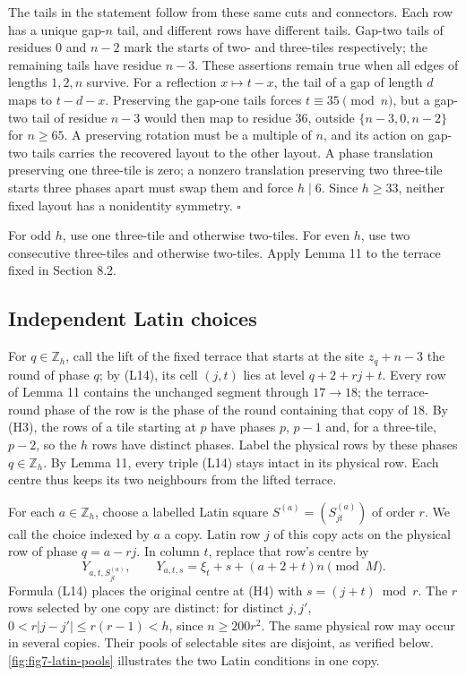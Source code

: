 \documentclass[11pt,a4paper]{article}
\begin{document}
The tails in the statement follow from these same cuts and connectors. Each row has a unique gap-\(n\) tail, and different rows have different tails. Gap-two tails of residues \(0\) and \(n-2\) mark the starts of two- and three-tiles respectively; the remaining tails have residue \(n-3\). These assertions remain true when all edges of lengths \(1,2,n\) survive. For a reflection \(x\mapsto t-x\), the tail of a gap of length \(d\) maps to \(t-d-x\). Preserving the gap-one tails forces \(t\equiv35\pmod n\), but a gap-two tail of residue \(n-3\) would then map to residue \(36\), outside \(\{n-3,0,n-2\}\) for \(n\geq65\). A preserving rotation must be a multiple of \(n\), and its action on gap-two tails carries the recovered layout to the other layout. A phase translation preserving one three-tile is zero; a nonzero translation preserving two three-tile starts three phases apart must swap them and force \(h\mid6\). Since \(h\geq33\), neither fixed layout has a nonidentity symmetry. \(\square\)

For odd \(h\), use one three-tile and otherwise two-tiles. For even \(h\), use two consecutive three-tiles and otherwise two-tiles. Apply Lemma 11 to the terrace fixed in Section 8.2.

\hypertarget{independent-latin-choices}{%
\subsection{Independent Latin choices}\label{independent-latin-choices}}

For \(q\in\mathbb Z_h\), call the lift of the fixed terrace that starts at the site \(z_q+n-3\) the round of phase \(q\); by (L14), its cell \((j,t)\) lies at level \(q+2+rj+t\). Every row of Lemma 11 contains the unchanged segment through \(17\to18\); the terrace-round phase of the row is the phase of the round containing that copy of \(18\). By (H3), the rows of a tile starting at \(p\) have phases \(p\), \(p-1\) and, for a three-tile, \(p-2\), so the \(h\) rows have distinct phases. Label the physical rows by these phases \(q\in\mathbb Z_h\). By Lemma 11, every triple (L14) stays intact in its physical row. Each centre thus keeps its two neighbours from the lifted terrace.

For each \(a\in\mathbb Z_h\), choose a labelled Latin square \(S^{(a)}=(S^{(a)}_{jt})\) of order \(r\). We call the choice indexed by \(a\) a copy. Latin row \(j\) of this copy acts on the physical row of phase \(q=a-rj\). In column \(t\), replace that row's centre by \begin{equation}
Y_{a,t,S^{(a)}_{jt}},\qquad
 Y_{a,t,s}=\xi_t+s+(a+2+t)n\pmod M.
\tag{H4}\label{eq:H4}
\end{equation} Formula (L14) places the original centre at (H4) with \(s=(j+t)\bmod r\). The \(r\) rows selected by one copy are distinct: for distinct \(j,j'\), \(0<r|j-j'|\leq r(r-1)<h\), since \(n\geq200r^2\). The same physical row may occur in several copies. Their pools of selectable sites are disjoint, as verified below. \autoref{fig:fig7-latin-pools} illustrates the two Latin conditions in one copy.
\end{document}
